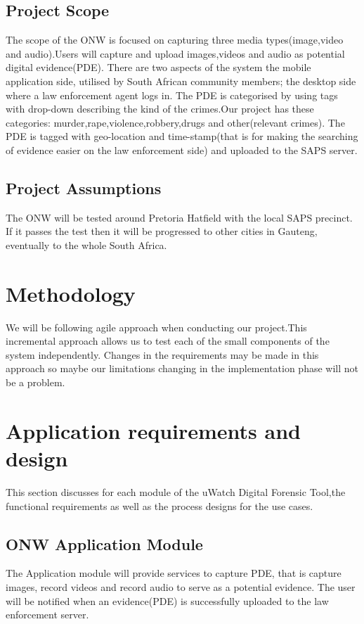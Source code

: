 \documentclass[a4paper,12pt]{article}
\begin{document}
\subsection{Project Scope}
The scope of the ONW is focused on capturing three media types(image,video and audio).Users will capture and upload images,videos and audio as potential digital evidence(PDE). There are two aspects of the system the mobile application side, utilised by South African community members; the desktop side where a law enforcement agent logs in. The PDE is categorised by using tags with drop-down describing the kind of the crimes.Our project has these categories: murder,rape,violence,robbery,drugs and other(relevant crimes). The PDE is tagged with geo-location and time-stamp(that is for making the searching of evidence easier on the law enforcement side) and uploaded to the SAPS server.

\subsection{Project Assumptions}
The ONW will be tested around Pretoria Hatfield with the local SAPS precinct. If it passes the test then it will be progressed to other cities in Gauteng, eventually to the whole South Africa. 

\section{Methodology}
We will be following agile approach when conducting our project.This incremental approach allows us to test each of the small components of the system independently.
Changes in the requirements may be made in this approach so maybe our limitations changing in the implementation phase will not be a problem.
 

\section{Application requirements and design}
This section discusses for each module of the uWatch Digital Forensic Tool,the functional requirements
as well as the process designs for the use cases.
\subsection{ONW Application Module}
The Application module will provide services to capture PDE, that is capture images, record videos and record audio to serve as a potential evidence. The user will be notified when an evidence(PDE) is successfully uploaded to the law enforcement server.
\end{document}
